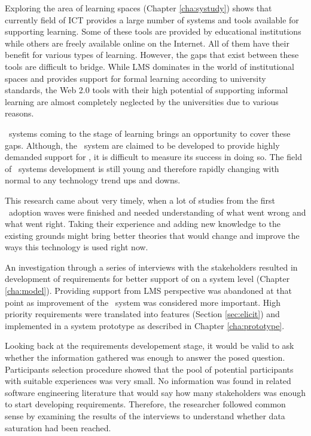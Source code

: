 
Exploring the area of learning spaces (Chapter \ref{cha:systudy}) shows that
currently field of ICT provides a large number of systems and tools available
for supporting learning. Some of these tools are provided by educational
institutions while others are freely available online on the Internet. All
of them have their benefit for various types of learning. However, the gaps
that exist between these tools are difficult to bridge. While LMS dominates in
the world of institutional spaces and provides support for formal learning
according to university standards, the Web 2.0 tools with their high potential
of supporting informal learning are almost completely neglected by the
universities due to various reasons.

\ep~systems coming to the stage of learning brings an opportunity to cover these
gaps. Although, the \ep~system are claimed to be developed to provide highly
demanded support for \LLLsn, it is difficult to measure its success in doing so.
The field of \ep~systems development is still young and therefore rapidly
changing with normal to any technology trend ups and downs.

This research came about very timely, when a lot of studies from the first
\ep~adoption waves were finished and needed understanding of what went wrong and
what went right. Taking their experience and adding new knowledge to the
existing grounds might bring better theories that would change and improve the
ways this technology is used right now.


An investigation through a series of interviews with the stakeholders resulted
in development of requirements for better support of \LLLs on a system level
(Chapter \ref{cha:model}). Providing support from LMS perspective was abandoned
at that point as improvement of the \ep~system was considered more important.
High priority requirements were translated into features (Section
\ref{sec:elicit}) and implemented in a system prototype as described in Chapter
\ref{cha:prototype}.

Looking back at the requirements developement stage, it would be valid to ask
whether the information gathered was enough to answer the posed question.
Participants selection procedure showed that the pool of potential participants
with suitable experiences was very small. No information was found in related
software engineering literature that would say how many stakeholders was enough
to start developing requirements. Therefore, the researcher followed common
sense by examining the results of the interviews to understand whether data
saturation had been reached.

